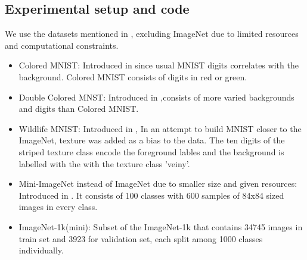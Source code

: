 \subsection{Experimental setup and code}
We use the datasets mentioned in \cite{sauer2021counterfactual}, excluding ImageNet \cite{deng2009imagenet} due to limited resources and computational constraints.
\iffalse
\begin{itemize}
    \setlength\itemsep{0.1mm}
    \item Colored MNIST: Introduced in \cite{arjovsky2019invariant} since usual MNIST digits correlates with the background. Colored MNIST consists of digits in red or green. 
    \item Double Colored MNST: Introduced in \cite{sauer2021counterfactual},consists of more varied backgrounds and digits than Colored MNIST. 
    \item Wildlife MNIST: Introduced in \cite{sauer2021counterfactual}, In an attempt to build MNIST \cite{lecun1998gradient} closer to the ImageNet\cite{deng2009imagenet}, texture was added as a bias to the data. The ten digits of the striped texture class encode the foreground lables and the background is labelled with the with the texture class 'veiny'.
    \item Mini-ImageNet\cite{mini-imagenet} instead of ImageNet\cite{deng2009imagenet} due to smaller size and given resources: Introduced in \cite{vinyals2016matching}. It consists of 100 classes with 600 samples of 84x84 sized images in every class.
    \item ImageNet-1k(mini): Subset of the ImageNet-1k\cite{ImageNet-1k} that contains 34745 images in train set and 3923 for validation set, each split among 1000 classes individually.
\end{itemize}

